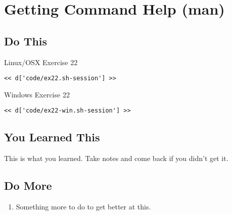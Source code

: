 \chapter{Getting Command Help (man)}

\section{Do This}

\begin{code}{Linux/OSX Exercise 22}
\begin{Verbatim}
<< d['code/ex22.sh-session'] >>
\end{Verbatim}
\end{code}

\begin{code}{Windows Exercise 22}
\begin{Verbatim}
<< d['code/ex22-win.sh-session'] >>
\end{Verbatim}
\end{code}

\section{You Learned This}

This is what you learned.  Take notes and come back if you didn't get it.

\section{Do More}

\begin{enumerate}
\item Something more to do to get better at this.
\end{enumerate}

